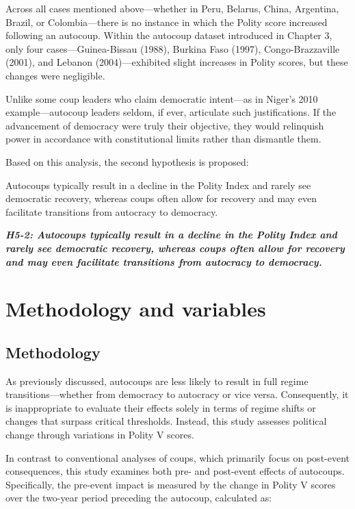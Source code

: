 \documentclass[
  12pt,
]{report}
\begin{document}
Across all cases mentioned above---whether in Peru, Belarus, China,
Argentina, Brazil, or Colombia---there is no instance in which the
Polity score increased following an autocoup. Within the autocoup
dataset introduced in Chapter 3, only four cases---Guinea-Bissau (1988),
Burkina Faso (1997), Congo-Brazzaville (2001), and Lebanon
(2004)---exhibited slight increases in Polity scores, but these changes
were negligible.

Unlike some coup leaders who claim democratic intent---as in Niger's
2010 example---autocoup leaders seldom, if ever, articulate such
justifications. If the advancement of democracy were truly their
objective, they would relinquish power in accordance with constitutional
limits rather than dismantle them.

Based on this analysis, the second hypothesis is proposed:

Autocoups typically result in a decline in the Polity Index and rarely
see democratic recovery, whereas coups often allow for recovery and may
even facilitate transitions from autocracy to democracy.

\textbf{\emph{H5-2: Autocoups typically result in a decline in the
Polity Index and rarely see democratic recovery, whereas coups often
allow for recovery and may even facilitate transitions from autocracy to
democracy.}}

\section{Methodology and variables}\label{methodology-and-variables}

\subsection*{Methodology}\label{methodology-1}

As previously discussed, autocoups are less likely to result in full
regime transitions---whether from democracy to autocracy or vice versa.
Consequently, it is inappropriate to evaluate their effects solely in
terms of regime shifts or changes that surpass critical thresholds.
Instead, this study assesses political change through variations in
Polity V scores.

In contrast to conventional analyses of coups, which primarily focus on
post-event consequences, this study examines both pre- and post-event
effects of autocoups. Specifically, the pre-event impact is measured by
the change in Polity V scores over the two-year period preceding the
autocoup, calculated as:
\end{document}
